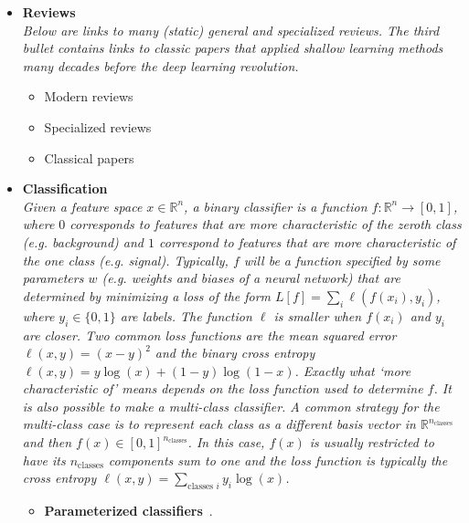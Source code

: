 \documentclass[12pt,letterpaper]{article}
\begin{document}
\begin{itemize}
\item \textbf{Reviews}
\\\textit{Below are links to many (static) general and specialized reviews.  The third bullet contains links to classic papers that applied shallow learning methods many decades before the deep learning revolution.}
	\begin{itemize}
		\item Modern reviews~\cite{Larkoski:2017jix,Guest:2018yhq,Albertsson:2018maf,Radovic:2018dip,Carleo:2019ptp,Bourilkov:2019yoi,Schwartz:2021ftp}
		\item Specialized reviews~\cite{Kasieczka:2019dbj,1807719,1808887,Psihas:2020pby,Butter:2020tvl,Forte:2020yip,Brehmer:2020cvb,Nachman:2020ccu,Duarte:2020ngm,Vlimant:2020enz,Cranmer:2019eaq,Rousseau:2020rnz,Kagan:2020yrm,Guan:2020bdl,deLima:2021fwm}
		 \item Classical papers~\cite{Denby:1987rk,Lonnblad:1990bi}
	\end{itemize}
\item \textbf{Classification}
\\\textit{Given a feature space $x\in\mathbb{R}^n$, a binary classifier is a function $f:\mathbb{R}^n\rightarrow [0,1]$, where $0$ corresponds to features that are more characteristic of the zeroth class (e.g. background) and $1$ correspond to features that are more characteristic of the one class (e.g. signal).  Typically, $f$ will be a function specified by some parameters $w$ (e.g. weights and biases of a neural network) that are determined by minimizing a loss of the form $L[f]=\sum_{i}\ell(f(x_i),y_i)$, where $y_i\in\{0,1\}$ are labels.  The function $\ell$ is smaller when $f(x_i)$ and $y_i$ are closer.  Two common loss functions are the mean squared error $\ell(x,y)=(x-y)^2$ and the binary cross entropy $\ell(x,y)=y\log(x)+(1-y)\log(1-x)$.  Exactly what `more characteristic of' means depends on the loss function used to determine $f$.  It is also possible to make a multi-class classifier.  A common strategy for the multi-class case is to represent each class as a different basis vector in $\mathbb{R}^{n_\text{classes}}$ and then $f(x)\in[0,1]^{n_\text{classes}}$.  In this case, $f(x)$ is usually restricted to have its $n_\text{classes}$ components sum to one and the loss function is typically the cross entropy $\ell(x,y)=\sum_\text{classes $i$} y_i\log(x)$.}
	\begin{itemize}
		\item \textbf{Parameterized classifiers}~\cite{Baldi:2016fzo,Cranmer:2015bka,Nachman:2021yvi}.

\end{itemize}
\end{itemize}
\end{document}
